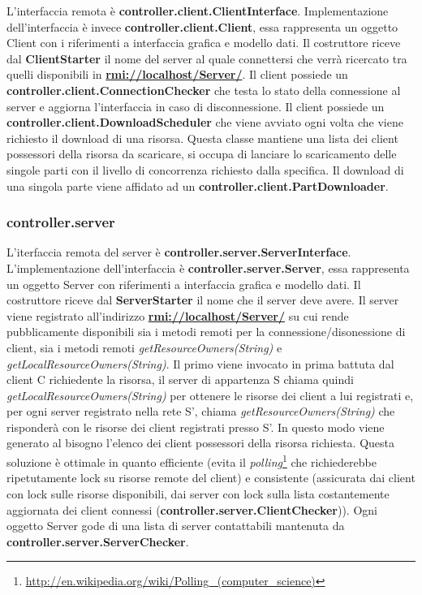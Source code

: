 \documentclass[
10pt, %
a4paper, %
oneside, %
BCOR5mm, %
]{scrartcl}
\begin{document}
 			L'interfaccia remota è \textbf{controller.client.ClientInterface}.
 			Implementazione dell'interfaccia è invece \textbf{controller.client.Client}, essa rappresenta un oggetto Client con i riferimenti a interfaccia grafica e modello dati. Il costruttore riceve dal \textbf{ClientStarter} il nome del server al quale connettersi che verrà ricercato tra quelli disponibili in \textbf{\href{rmi://localhost/Server/}{rmi://localhost/Server/}}. Il client possiede un \textbf{controller.client.ConnectionChecker} che testa lo stato della connessione al server e aggiorna l'interfaccia in caso di disconnessione. Il client possiede un \textbf{controller.client.DownloadScheduler} che viene avviato ogni volta che viene richiesto il download di una risorsa. Questa classe mantiene una lista dei client possessori della risorsa da scaricare, si occupa di lanciare lo scaricamento delle singole parti con il livello di concorrenza richiesto dalla specifica. Il download di una singola parte viene affidato ad un \textbf{controller.client.PartDownloader}.

 		\subsubsection{controller.server}

 			L'iterfaccia remota del server è \textbf{controller.server.ServerInterface}. L'implementazione dell'interfaccia è \textbf{controller.server.Server}, essa rappresenta un oggetto Server con riferimenti a interfaccia grafica e modello dati. Il costruttore riceve dal \textbf{ServerStarter} il nome che il server deve avere. Il server viene registrato all'indirizzo \textbf{\href{rmi://localhost/Server/nome_server}{rmi://localhost/Server/}} su cui rende pubblicamente disponibili sia i metodi remoti per la connessione/disonessione di client, sia i metodi remoti \emph{getResourceOwners(String)} e \emph{getLocalResourceOwners(String)}.
 			Il primo viene invocato in prima battuta dal client C richiedente la risorsa, il server di appartenza S chiama quindi \emph{getLocalResourceOwners(String)} per ottenere le risorse dei client a lui registrati e, per ogni server registrato nella rete S', chiama \emph{getResourceOwners(String)} che risponderà con le risorse dei client registrati presso S'. In questo modo viene generato al bisogno l'elenco dei client possessori della risorsa richiesta. Questa soluzione è ottimale in quanto efficiente (evita il \emph{polling}\footnote{\href{http://en.wikipedia.org/wiki/Polling_(computer_science)}{http://en.wikipedia.org/wiki/Polling\_(computer\_science)}} che richiederebbe ripetutamente lock su risorse remote del client) e consistente (assicurata dai client con lock sulle risorse disponibili, dai server con lock sulla lista costantemente aggiornata dei client connessi (\textbf{controller.server.ClientChecker})). Ogni oggetto Server gode di una lista di server contattabili mantenuta da \textbf{controller.server.ServerChecker}.
\end{document}
